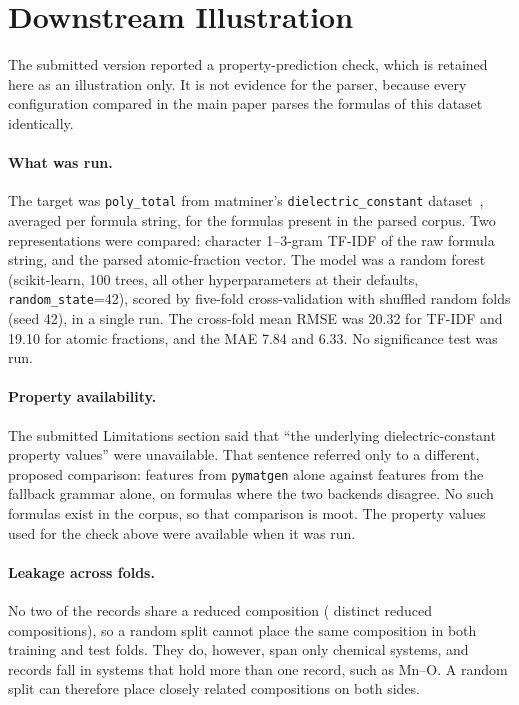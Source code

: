 \documentclass[10pt,a4paper]{article}
\newcommand{\pmg}{\texttt{pymatgen}\xspace}
\begin{document}
\section{Downstream Illustration}
\label{sec:s5}
The submitted version reported a property-prediction check, which is retained here as an illustration only. It is not evidence for the parser, because every configuration compared in the main paper parses the \NDiel{} formulas of this dataset identically.

\paragraph{What was run.} The target was \texttt{poly\_total} from matminer's \texttt{dielectric\_constant} dataset~\cite{petousisS}, averaged per formula string, for the \NDiel{} formulas present in the parsed corpus. Two representations were compared: character 1--3-gram TF-IDF of the raw formula string, and the parsed atomic-fraction vector. The model was a random forest (scikit-learn, 100 trees, all other hyperparameters at their defaults, \texttt{random\_state}=42), scored by five-fold cross-validation with shuffled random folds (seed 42), in a single run. The cross-fold mean RMSE was 20.32 for TF-IDF and 19.10 for atomic fractions, and the MAE 7.84 and 6.33. No significance test was run.

\paragraph{Property availability.} The submitted Limitations section said that ``the underlying dielectric-constant property values'' were unavailable. That sentence referred only to a different, proposed comparison: features from \pmg alone against features from the fallback grammar alone, on formulas where the two backends disagree. No such formulas exist in the corpus, so that comparison is moot. The property values used for the check above were available when it was run.

\paragraph{Leakage across folds.} No two of the \NDiel{} records share a reduced composition (\NDielReduced{} distinct reduced compositions), so a random split cannot place the same composition in both training and test folds. They do, however, span only \NDielSystems{} chemical systems, and \NDielInSharedSystems{} records fall in \NDielSharedSystems{} systems that hold more than one record, such as Mn--O. A random split can therefore place closely related compositions on both sides.
\end{document}
